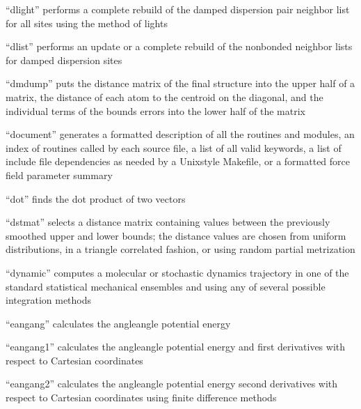 \documentclass[letterpaper,11pt,english]{sphinxmanual}
\begin{document}

“dlight” performs a complete rebuild of the damped dispersion
pair neighbor list for all sites using the method of lights


“dlist” performs an update or a complete rebuild of the
nonbonded neighbor lists for damped dispersion sites


“dmdump” puts the distance matrix of the final structure
into the upper half of a matrix, the distance of each atom
to the centroid on the diagonal, and the individual terms
of the bounds errors into the lower half of the matrix


“document” generates a formatted description of all the routines
and modules, an index of routines called by each source file, a
list of all valid keywords, a list of include file dependencies
as needed by a Unix\sphinxhyphen{}style Makefile, or a formatted force field
parameter summary


“dot” finds the dot product of two vectors


“dstmat” selects a distance matrix containing values between
the previously smoothed upper and lower bounds; the distance
values are chosen from uniform distributions, in a triangle
correlated fashion, or using random partial metrization


“dynamic” computes a molecular or stochastic dynamics trajectory
in one of the standard statistical mechanical ensembles and using
any of several possible integration methods


“eangang” calculates the angle\sphinxhyphen{}angle potential energy


“eangang1” calculates the angle\sphinxhyphen{}angle potential energy and
first derivatives with respect to Cartesian coordinates


“eangang2” calculates the angle\sphinxhyphen{}angle potential energy
second derivatives with respect to Cartesian coordinates
using finite difference methods
\end{document}

